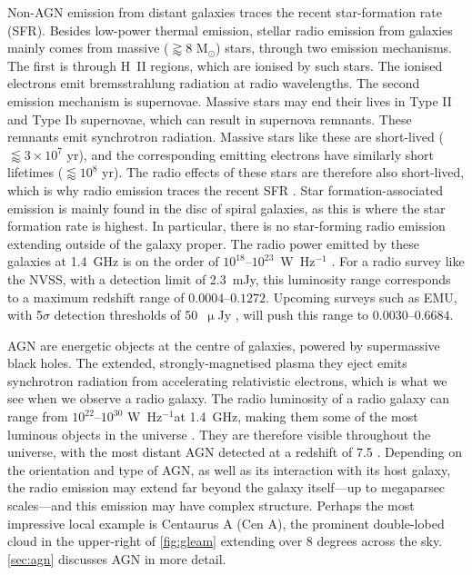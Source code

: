     Non-AGN emission from distant galaxies traces the recent star-formation rate (SFR). Besides low-power thermal emission, stellar radio emission from galaxies mainly comes from massive ($\gtrapprox 8$ M$_\odot$) stars, through two emission mechanisms. The first is through H~II regions, which are ionised by such stars. The ionised electrons emit bremsstrahlung radiation at radio wavelengths. The second emission mechanism is supernovae. Massive stars may end their lives in Type II and Type Ib supernovae, which can result in supernova remnants. These remnants emit synchrotron radiation. Massive stars like these are short-lived ($\lessapprox 3 \times 10^7$ yr), and the corresponding emitting electrons have similarly short lifetimes ($\lessapprox 10^8$ yr). The radio effects of these stars are therefore also short-lived, which is why radio emission traces the recent SFR \citep{condon_radio_1992}. Star formation-associated emission is mainly found in the disc of spiral galaxies, as this is where the star formation rate is highest. In particular, there is no star-forming radio emission extending outside of the galaxy proper. The radio power emitted by these galaxies at 1.4~GHz is on the order of $10^{18}$--$10^{23}$~W~Hz$^{-1}$ \citep{condon_radio_1992}. For a radio survey like the NVSS, with a detection limit of 2.3~mJy, this luminosity range corresponds to a maximum redshift range of $0.0004$--$0.1272$. Upcoming surveys such as EMU, with 5$\sigma$ detection thresholds of 50~$\upmu${}Jy \citep{norris_emu_2011}, will push this range to $0.0030$--$0.6684$.

    AGN are energetic objects at the centre of galaxies, powered by supermassive black holes. The extended, strongly-magnetised plasma they eject emits synchrotron radiation from accelerating relativistic electrons, which is what we see when we observe a radio galaxy. The radio luminosity of a radio galaxy can range from $10^{22}$--$10^{30}$ W~Hz$^{-1}$\citeneeded at 1.4~GHz, making them some of the most luminous objects in the universe \citeneeded. They are therefore visible throughout the universe, with the most distant AGN detected at a redshift of 7.5 \citep{banados_800-million-solar-mass_2018}. Depending on the orientation and type of AGN, as well as its interaction with its host galaxy, the radio emission may extend far beyond the galaxy itself---up to megaparsec scales---and this emission may have complex structure. Perhaps the most impressive local example is Centaurus A (Cen A), the prominent double-lobed cloud in the upper-right of \autoref{fig:gleam} extending over 8 degrees across the sky. \autoref{sec:agn} discusses AGN in more detail.

